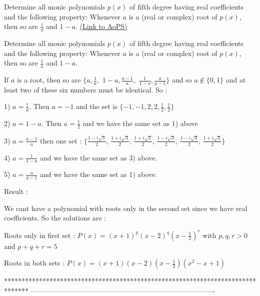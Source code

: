 \begin{problem}
	Determine all monic polynomials $ p(x)$ of fifth degree having real coefficients and the following property: Whenever $ a$ is a (real or complex) root of $ p(x)$, then so are $ \frac{1}{a}$ and $ 1-a$.
	\flushright \href{https://artofproblemsolving.com/community/c6h287636}{(Link to AoPS)}
\end{problem}



\begin{solution}
	\begin{tcolorbox}Determine all monic polynomials $ p(x)$ of fifth degree having real coefficients and the following property: Whenever $ a$ is a (real or complex) root of $ p(x)$, then so are $ \frac {1}{a}$ and $ 1 - a$.\end{tcolorbox}

If $ a$ is a root, then so are $ \{a, \frac 1a,$ $ 1-a, \frac{a-1}{a},$ $ \frac{1}{1-a}, \frac{a}{a-1}\}$ and so $ a\notin\{0,1\}$ and at least two of these six numbers must be identical. So :

1) $ a=\frac 1a$. Then $ a=-1$ and the set is $ \{-1, -1, 2, 2, \frac 12, \frac 12\}$

2) $ a=1-a$. Then $ a=\frac 12$ and we have the same set as 1) above

3) $ a=\frac{a-1}{a}$ then one set : $ \{\frac{1-i\sqrt 3}{2}$, $ \frac{1+i\sqrt 3}{2}$, $ \frac{1+i\sqrt 3}{2}$, $ \frac{1-i\sqrt 3}{2}$, $ \frac{1-i\sqrt 3}{2}$, $ \frac{1+i\sqrt 3}{2}\}$ 

4) $ a=\frac{1}{1-a}$ and we have the same set as 3) above.

5) $ a=\frac{a}{a-1}$ and we have the same set as 1) above.

Result :

We cant have a polynomial with roots only in the second set since we have real coefficients. So the solutions are :

Roots only in first set : $ P(x)=(x+1)^p(x-2)^q(x-\frac 12)^r$ with $ p,q,r>0$ and $ p+q+r=5$

Roots in both sets : $ P(x)=(x+1)(x-2)(x-\frac 12)(x^2-x+1)$
\end{solution}
*******************************************************************************
-------------------------------------------------------------------------------

